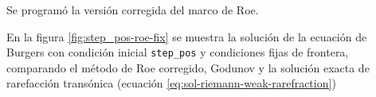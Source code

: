\documentclass[12pt]{article}
\begin{document}
	Se programó la versión corregida del marco de Roe. 
 	
	
	En la figura \ref{fig:step_pos-roe-fix} se muestra la solución de la ecuación de Burgers con condición inicial \texttt{step\_pos} y condiciones fijas de frontera, comparando el método de Roe corregido, Godunov y la solución exacta de rarefacción transónica (ecuación \ref{eq:sol-riemann-weak-rarefraction})
%	
	
\end{document}
